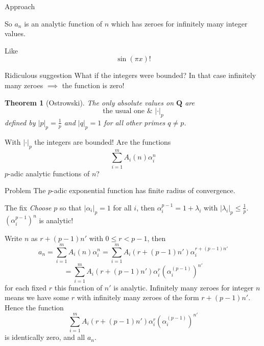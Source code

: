 \documentclass[notheorems]{beamer}
\theoremstyle{plain}
\newtheorem{theorem}{Theorem}[section]
\theoremstyle{definition}
\theoremstyle{definition}
\theoremstyle{definition}
\newcommand{\QQ}{\mathbf Q}
\newcommand{\lt}{<}
\begin{document}
\begin{frame}{Approach}

So \(a_n\) is an analytic function of \(n\) which has zeroes for infinitely many integer values.
\par\pause
Like \[\sin(\pi x)!\]
\par\pause
\begin{alertblock}{Ridiculous suggestion}
What if the integers were bounded? In that case infinitely many zeroes \(\implies\) the function is zero!
\end{alertblock}
\end{frame}

\begin{frame}
\begin{theorem}[{Ostrowski}]\label{theorem-36}
The only absolute values on \(\QQ\) are%
\begin{equation*}
	\text{the usual one}\,\, \&\,\, |\cdot|_p
\end{equation*}
defined by \(|p|_p = \frac1p\) and \(|q|_p = 1\) for all other primes \(q \ne p\).%
\end{theorem}
\pause
With \(|\cdot|_p\) the integers are bounded!
\pause
Are the functions%
\begin{equation*}
\sum_{i=1}^m A_i(n)\alpha_i^n
\end{equation*}
\(p\)-adic analytic functions of \(n\)?%
\par
\pause
\begin{alertblock}{Problem}
The \(p\)-adic exponential function has finite radius of convergence.
\end{alertblock}
\pause
\begin{exampleblock}{The fix}
\emph{Choose} \(p\) so that \(|\alpha_i|_p = 1\) for all \(i\), then \(\alpha_i^{p-1} = 1 + \lambda_i\) with \(|\lambda_i|_p \le \frac 1p\).
\((\alpha_i^{p-1})^n\) is analytic!%
\end{exampleblock}
\end{frame}

\begin{frame}
Write \(n\) as \(r + (p-1)n'\) with \(0\le r \lt p-1\)\pause, then
\begin{equation*}
a_n = \sum_{i=1}^m A_i(n)\alpha_i^n = \sum_{i=1}^m A_i(r + (p-1)n')\alpha_i^{r + (p-1)n'}
\end{equation*}
%
\begin{equation*}
= \sum_{i=1}^m A_i(r + (p-1)n')\alpha_i^{r} (\alpha_i^{(p-1)})^{n'}
\end{equation*}
for each fixed \(r\) this function of \(n'\) is analytic. Infinitely many zeroes for integer \(n\) means we have some \(r\) with infinitely many zeroes of the form \(r + (p-1)n'\). Hence the function%
\begin{equation*}
\sum_{i=1}^m A_i(r + (p-1)n')\alpha_i^{r} (\alpha_i^{(p-1)})^{n'}
\end{equation*}
is identically zero, and all \(a_n\).%
\par
\end{frame}
\end{document}

